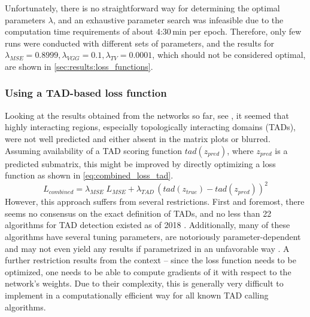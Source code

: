Unfortunately, there is no straightforward way for determining the optimal parameters $\lambda$,
and an exhaustive parameter search was infeasible due to the computation time requirements of about 4:30\,min per epoch.
Therefore, only few runs were conducted with different sets of parameters,
and the results for $\lambda_\mathit{MSE} = 0.8999, \lambda_\mathit{VGG}=0.1, \lambda_\mathit{TV}=0.0001$,
which should not be considered optimal, are shown in \cref{sec:results:loss_functions}.

\subsubsection{Using a TAD-based loss function} \label{sec:improve:TAD_loss}
Looking at the results obtained from the networks so far, see \xxx, it seemed that highly interacting regions,
especially topologically interacting domains (TADs), were not well predicted and either absent
in the matrix plots or blurred.
Assuming availability of a TAD scoring function $\mathit{tad}(z_\mathit{pred})$, where $z_\mathit{pred}$ is a predicted submatrix,
this might be improved by directly optimizing a loss function as shown in \cref{eq:combined_loss_tad}.
\begin{equation}
 L_\mathit{combined} = \lambda_\mathit{MSE}\;L_\mathit{MSE} + \lambda_\mathit{TAD} \, (\mathit{tad}(z_\mathit{true}) - \mathit{tad}(z_\mathit{pred}))^2 \label{eq:combined_loss_tad}
\end{equation}
However, this approach suffers from several restrictions.
First and foremost, there seems no consensus on the exact definition of TADs, 
and no less than 22 algorithms for TAD detection existed as of 2018 \cite{Dali2017,Zufferey2018}.
Additionally, many of these algorithms have several tuning parameters, are notoriously parameter-dependent
and may not even yield any results if parametrized in an unfavorable way \cite{Zufferey2018}. 
A further restriction results from the context -- since the loss function needs to be optimized,
one needs to be able to compute gradients of it with respect to the network's weights.
Due to their complexity, this is generally very difficult to implement in a computationally efficient way for all known TAD calling algorithms.

